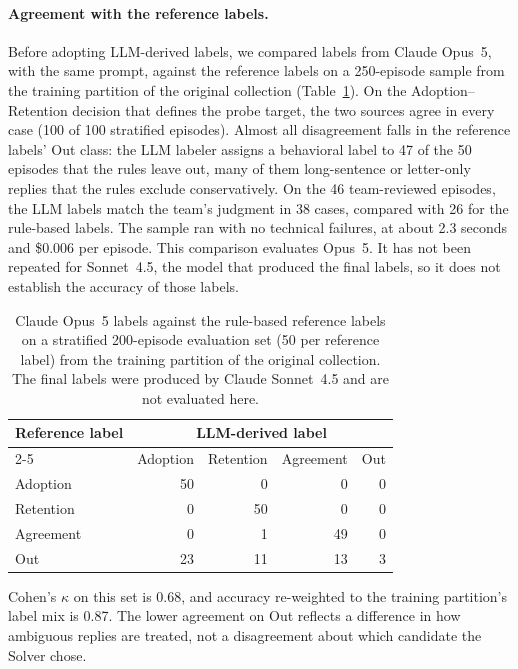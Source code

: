 \paragraph{Agreement with the reference labels.} Before adopting
LLM-derived labels, we compared labels from Claude Opus~5, with the same
prompt, against the reference labels on a
250-episode sample from the training partition of the original collection
(Table~\ref{tab:label-agreement}). On the Adoption--Retention decision that
defines the probe target, the two sources agree in every case (100 of 100
stratified episodes). Almost all disagreement falls in the reference
labels' Out class: the LLM labeler assigns a behavioral label to 47 of the
50 episodes that the rules leave out, many of them long-sentence or
letter-only replies that the rules exclude conservatively. On the 46
team-reviewed episodes, the LLM labels match the team's judgment in 38
cases, compared with 26 for the rule-based labels. The sample ran with no
technical failures, at about 2.3 seconds and \$0.006 per episode. This
comparison evaluates Opus~5. It has not been repeated for Sonnet~4.5, the
model that produced the final labels, so it does not establish the accuracy
of those labels.

\begin{table}[htbp]
    \centering
    \caption{Claude Opus~5 labels against the rule-based reference labels on
    a stratified 200-episode evaluation set (50 per reference label) from the
    training partition of the original collection. The final labels were
    produced by Claude Sonnet~4.5 and are not evaluated here.}
    \label{tab:label-agreement}
    \begin{tabular}{lrrrr}
        \toprule
        Reference label & \multicolumn{4}{c}{LLM-derived label} \\
        \cmidrule(lr){2-5}
         & Adoption & Retention & Agreement & Out \\
        \midrule
        Adoption  & 50 &  0 &  0 & 0 \\
        Retention &  0 & 50 &  0 & 0 \\
        Agreement &  0 &  1 & 49 & 0 \\
        Out       & 23 & 11 & 13 & 3 \\
        \bottomrule
    \end{tabular}
\end{table}

Cohen's $\kappa$ on this set is 0.68, and accuracy re-weighted to the
training partition's label mix is 0.87. The lower agreement on Out reflects
a difference in how ambiguous replies are treated, not a disagreement about
which candidate the Solver chose.

